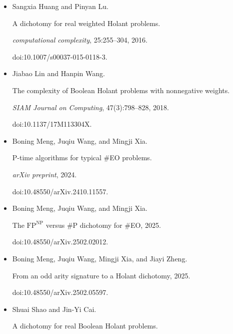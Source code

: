 \begin{itemize}
\item[] 
[21]

Sangxia Huang and Pinyan Lu.


A dichotomy for real weighted Holant problems.


\emph{computational complexity}, 25:255–304, 2016.


doi:10.1007/s00037-015-0118-3.





\item[] 
[22]

Jiabao Lin and Hanpin Wang.


The complexity of Boolean Holant problems with nonnegative
weights.


\emph{SIAM Journal on Computing}, 47(3):798–828, 2018.


doi:10.1137/17M113304X.





\item[] 
[23]

Boning Meng, Juqiu Wang, and Mingji Xia.


P-time algorithms for typical \#EO problems.


\emph{arXiv preprint}, 2024.


doi:10.48550/arXiv.2410.11557.





\item[] 
[24]

Boning Meng, Juqiu Wang, and Mingji Xia.


The $\text{FP}^{\text{NP}}$ versus \#P dichotomy for \#EO, 2025.


doi:10.48550/arXiv.2502.02012.





\item[] 
[25]

Boning Meng, Juqiu Wang, Mingji Xia, and Jiayi Zheng.


From an odd arity signature to a Holant dichotomy, 2025.


doi:10.48550/arXiv.2502.05597.





\item[] 
[26]

Shuai Shao and Jin-Yi Cai.


A dichotomy for real Boolean Holant problems.



\end{itemize}
